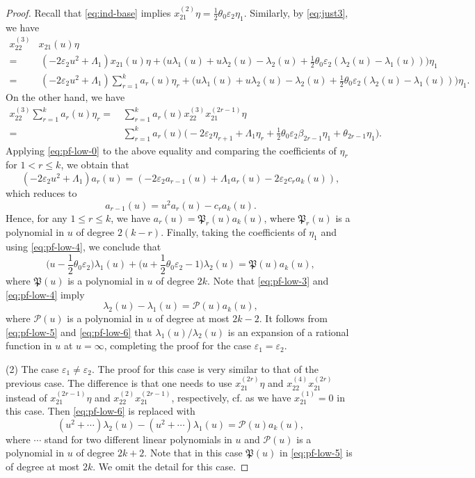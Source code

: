 \documentclass[11pt,reqno]{amsart}
\numberwithin{equation}{section}
\theoremstyle{definition}
\theoremstyle{remark}
\newcommand{\beq}{\begin{equation}}
\newcommand{\eeq}{\end{equation}}
\newcommand{\lle}{\leqslant}
\newcommand{\la}{\lambda}
\newcommand{\La}{\Lambda}
\newcommand{\ve}{\varepsilon}
\begin{document}
\begin{proof}
Recall that \eqref{eq:ind-base} implies $x_{21}^{(2)}\eta=\frac{1}{2}\theta_0\ve_2\eta_1$. Similarly, by \eqref{eq:just3}, we have
\begin{align*}
	x_{22}^{(3)}&x_{21}(u)\eta\\
	=&\,(-2\ve_2u^2+\La_1)x_{21}(u)\eta+\Big(u\la_1(u)+u\la_2(u)-\la_2(u)+\frac{1}{2}\theta_0\ve_2(\la_2(u)-\la_1(u))\Big)\eta_1\\
	=&\,(-2\ve_2u^2+\La_1)\sum_{r=1}^k a_r(u)\eta_r+\Big(u\la_1(u)+u\la_2(u)-\la_2(u)+\frac{1}{2}\theta_0\ve_2(\la_2(u)-\la_1(u))\Big)\eta_1.
\end{align*}
On the other hand, we have
\begin{align*}
	x_{22}^{(3)}\sum_{r=1}^k a_r(u)\eta_r=&\,\sum_{r=1}^k a_r(u)x_{22}^{(3)}x_{21}^{(2r-1)}\eta\\
	=&\, \sum_{r=1}^k a_r(u)\Big(-2\ve_2\eta_{r+1}+\La_1\eta_r+\frac{1}{2}\theta_0\ve_2\beta_{2r-1}\eta_1+\theta_{2r-1}\eta_1\Big).
\end{align*}
Applying \eqref{eq:pf-low-0} to the above equality and comparing the coefficients of $\eta_r$ for $1<r\lle k$, we obtain that
\[
(-2\ve_2u^2+\La_1)a_r(u)=(-2\ve_2a_{r-1}(u)+\La_1 a_r(u)-2\ve_2 c_ra_k(u)),
\]
which reduces to
\beq\label{eq:pf-low-4}
a_{r-1}(u)=u^2a_r(u)-c_ra_k(u).
\eeq
Hence, for any $1\lle r\lle k$, we have $a_r(u)=\mathfrak P_r(u)a_k(u)$, where $\mathfrak P_r(u)$ is a polynomial in $u$ of degree $2(k-r)$. Finally, taking the coefficients of $\eta_1$ and using \eqref{eq:pf-low-4}, we conclude that
\beq\label{eq:pf-low-5}
\Big(u-\frac{1}{2}\theta_0\ve_2\Big)\la_1(u)+\Big(u+\frac{1}{2}\theta_0\ve_2-1\Big)\la_2(u)=\mathfrak P(u)a_k(u),
\eeq
where $\mathfrak P(u)$ is a polynomial in $u$ of degree $2k$. Note that \eqref{eq:pf-low-3} and \eqref{eq:pf-low-4} imply
\beq\label{eq:pf-low-6}
\la_2(u)-\la_1(u)=\mathscr P(u) a_k(u),
\eeq
where $\mathscr P(u)$ is a polynomial in $u$ of degree at most $2k-2$. It follows from \eqref{eq:pf-low-5} and \eqref{eq:pf-low-6} that $\la_1(u)/\la_2(u)$ is an expansion of a rational function in $u$ at $u=\infty$, completing the proof for the case $\ve_1=\ve_2$.

(2) The case $\ve_1\ne\ve_2$. The proof for this case is very similar to that of the previous case. The difference is that one needs to use $x_{21}^{(2r)}\eta$ and $x_{22}^{(4)}x_{21}^{(2r)}$ instead of $x_{21}^{(2r-1)}\eta$ and $x_{22}^{(2)}x_{21}^{(2r-1)}$, respectively, cf. \cite[Proposition 6.1]{Molev1998finite} as we have $x_{21}^{(1)}=0$ in this case. Then \eqref{eq:pf-low-6} is replaced with
\[
(u^2+\cdots)\la_2(u)-(u^2+\cdots)\la_1(u)=\mathscr P(u)a_k(u),
\]
where $\cdots$ stand for two different linear polynomials  in $u$ and $\mathscr P(u)$ is a polynomial in $u$ of degree $2k+2$. Note that in this case $\mathfrak P(u)$ in \eqref{eq:pf-low-5} is of degree at most $2k$.
We omit the detail for this case.
\end{proof}
\end{document}
